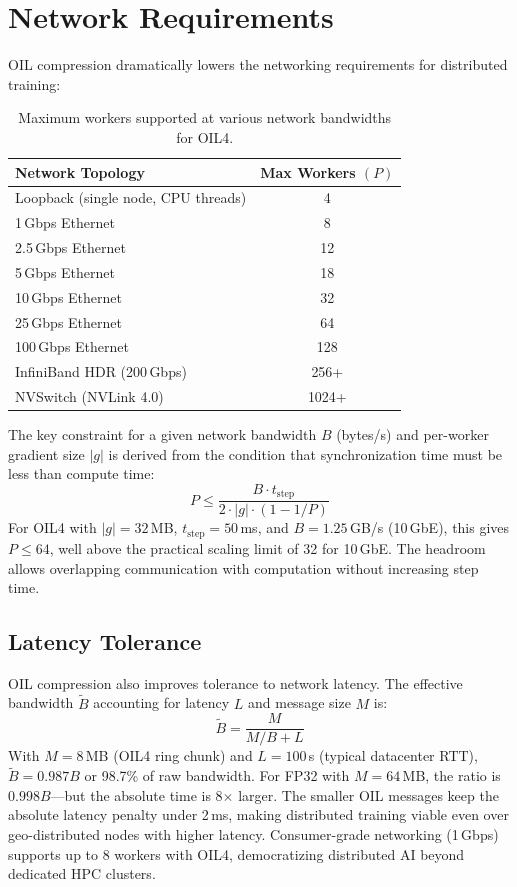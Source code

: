 \section{Network Requirements}
\label{sec:network_reqs}

OIL compression dramatically lowers the networking requirements for distributed training:

\begin{table}[H]
\centering
\caption{Maximum workers supported at various network bandwidths for OIL4.}
\label{tab:network_reqs}
\begin{tabular}{lc}
\toprule
\textbf{Network Topology} & \textbf{Max Workers $(P)$} \\
\midrule
Loopback (single node, CPU threads) & 4 \\
1\,Gbps Ethernet                     & 8 \\
2.5\,Gbps Ethernet                   & 12 \\
5\,Gbps Ethernet                     & 18 \\
10\,Gbps Ethernet                    & 32 \\
25\,Gbps Ethernet                    & 64 \\
100\,Gbps Ethernet                   & 128 \\
InfiniBand HDR (200\,Gbps)           & 256+ \\
NVSwitch (NVLink 4.0)               & 1024+ \\
\bottomrule
\end{tabular}
\end{table}

The key constraint for a given network bandwidth $B$ (bytes/s) and per-worker gradient size $|g|$ is derived from the condition that synchronization time must be less than compute time:
\[
P \leq \frac{B \cdot t_{\text{step}}}{2 \cdot |g| \cdot (1 - 1/P)}
\]
For OIL4 with $|g| = 32$\,MB, $t_{\text{step}} = 50$\,ms, and $B = 1.25$\,GB/s (10\,GbE), this gives $P \leq 64$, well above the practical scaling limit of 32 for 10\,GbE. The headroom allows overlapping communication with computation without increasing step time.

\subsection{Latency Tolerance}

OIL compression also improves tolerance to network latency. The effective bandwidth $\tilde{B}$ accounting for latency $L$ and message size $M$ is:
\[
\tilde{B} = \frac{M}{M/B + L}
\]
With $M = 8$\,MB (OIL4 ring chunk) and $L = 100$\,\textmu s (typical datacenter RTT), $\tilde{B} = 0.987B$ or 98.7\% of raw bandwidth. For FP32 with $M = 64$\,MB, the ratio is $0.998B$---but the absolute time is 8$\times$ larger. The smaller OIL messages keep the absolute latency penalty under 2\,ms, making distributed training viable even over geo-distributed nodes with higher latency. Consumer-grade networking (1\,Gbps) supports up to 8 workers with OIL4, democratizing distributed AI beyond dedicated HPC clusters.
